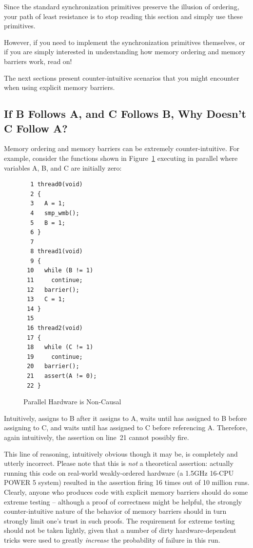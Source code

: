 Since the standard synchronization primitives preserve the illusion of
ordering, your path of least resistance is to stop reading
this section and simply use these primitives.

However, if you need to implement the synchronization primitives
themselves, or if you are simply interested in understanding how memory
ordering and memory barriers work, read on!

The next sections present counter-intuitive scenarios that you might
encounter when using explicit memory barriers.

\subsection{If B Follows A, and C Follows B, Why Doesn't C Follow A?}
\label{sec:advsync:If B Follows A, and C Follows B, Why Doesn't C Follow A?}

Memory ordering and memory barriers can be extremely counter-intuitive.
For example, consider the functions shown in
Figure~\ref{fig:advsync:Parallel Hardware is Non-Causal}
executing in parallel
where variables A, B, and C are initially zero:

\begin{figure}[htbp]
{ \centering
\scriptsize
\begin{verbatim}
  1 thread0(void)
  2 {
  3   A = 1;
  4   smp_wmb();
  5   B = 1;
  6 }
  7
  8 thread1(void)
  9 {
 10   while (B != 1)
 11     continue;
 12   barrier();
 13   C = 1;
 14 }
 15
 16 thread2(void)
 17 {
 18   while (C != 1)
 19     continue;
 20   barrier();
 21   assert(A != 0);
 22 }
\end{verbatim}
}
\caption{Parallel Hardware is Non-Causal}
\label{fig:advsync:Parallel Hardware is Non-Causal}
\end{figure}

Intuitively,  assigns to B after it assigns to A,
 waits until  has assigned to B before
assigning to C, and  waits until  has
assigned to C before referencing A.
Therefore, again intuitively, the assertion on line~21 cannot possibly
fire.

This line of reasoning, intuitively obvious though it may be, is completely
and utterly incorrect.
Please note that this is \emph{not} a theoretical assertion:
actually running this code on real-world weakly-ordered hardware
(a 1.5GHz 16-CPU POWER 5 system) resulted in the assertion firing
16 times out of 10 million runs.
Clearly, anyone who produces code with explicit memory barriers
should do some extreme testing -- although a proof of correctness might
be helpful, the strongly counter-intuitive nature of the behavior of
memory barriers should in turn strongly limit one's trust in such proofs.
The requirement for extreme testing should not be taken lightly, given
that a number of dirty hardware-dependent tricks were used to
greatly \emph{increase} the probability of failure in this run.

